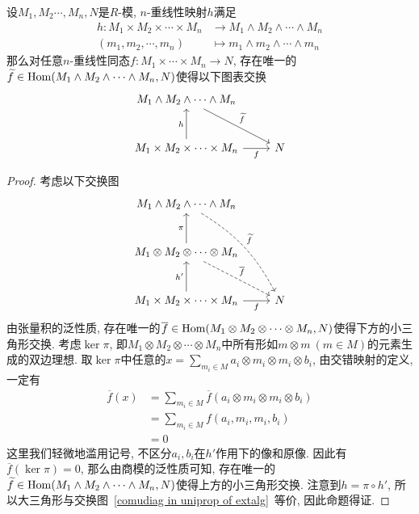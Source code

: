 \begin{prop}
    设$M_1,M_2\cdots,M_n,N$是$R$-模, $n$-重线性映射$h$满足
    \begin{align*}
        h:M_1\times M_2\times\cdots\times M_n&\to M_1\wedge M_2\wedge\cdots\wedge M_n\\
        (m_1,m_2,\cdots,m_n)&\mapsto m_1\wedge m_2\wedge\cdots\wedge m_n
    \end{align*}
    那么对任意$n$-重线性同态$f:M_1\times\cdots\times M_n\to N$, 存在唯一的$\widetilde{f}\in\operatorname{Hom}(M_1\wedge M_2\wedge\cdots\wedge M_n,N)$使得以下图表交换
    \begin{equation}
        \begin{tikzcd}[row sep=large]
            M_1\wedge M_2\wedge\cdots\wedge M_n  \arrow[dr, "\widetilde{f}"] & \\
            M_1\times M_2\times\cdots\times M_n \arrow[u, "h"] \arrow[r, "f"'] & N
        \end{tikzcd}\label{comudiag in uniprop of extalg}
    \end{equation}
\end{prop}
\begin{proof}
    考虑以下交换图
    \[\begin{tikzcd}[row sep=large]
        M_1\wedge M_2\wedge\cdots\wedge M_n \arrow[ddr, dashed, bend left=15, "\widetilde{f}"] & \\
        M_1\otimes M_2\otimes\cdots\otimes M_n \arrow[u, "\pi"] \arrow[dr, dashed, "\overline{f}"] & \\
        M_1\times M_2\times\cdots\times M_n \arrow[u, "h'"] \arrow[r, "f"'] & N
    \end{tikzcd}\]
    由张量积的泛性质, 存在唯一的$\overline{f}\in\operatorname{Hom}(M_1\otimes M_2\otimes\cdots\otimes M_n,N)$使得下方的小三角形交换.
    考虑$\ker\pi$, 即$M_1\otimes M_2\otimes\cdots\otimes M_n$中所有形如$m\otimes m\ (m\in M)$的元素生成的双边理想.
    取$\ker\pi$中任意的$\displaystyle x=\sum_{m_i\in M}a_i\otimes m_i\otimes m_i\otimes b_i$, 由交错映射的定义, 一定有
    \begin{align*}
        \overline{f}(x)&=\sum_{m_i\in M}\overline{f}(a_i\otimes m_i\otimes m_i\otimes b_i)\\
        &=\sum_{m_i\in M}f(a_i,m_i,m_i,b_i)\\
        &=0
    \end{align*}
    这里我们轻微地滥用记号, 不区分$a_i,b_i$在$h'$作用下的像和原像.
    因此有$\overline{f}(\ker\pi)=0$, 那么由商模的泛性质可知, 存在唯一的$\widetilde{f}\in\operatorname{Hom}(M_1\wedge M_2\wedge\cdots\wedge M_n,N)$使得上方的小三角形交换.
    注意到$h=\pi\circ h'$, 所以大三角形与交换图~\eqref{comudiag in uniprop of extalg}~等价, 因此命题得证.
\end{proof}

